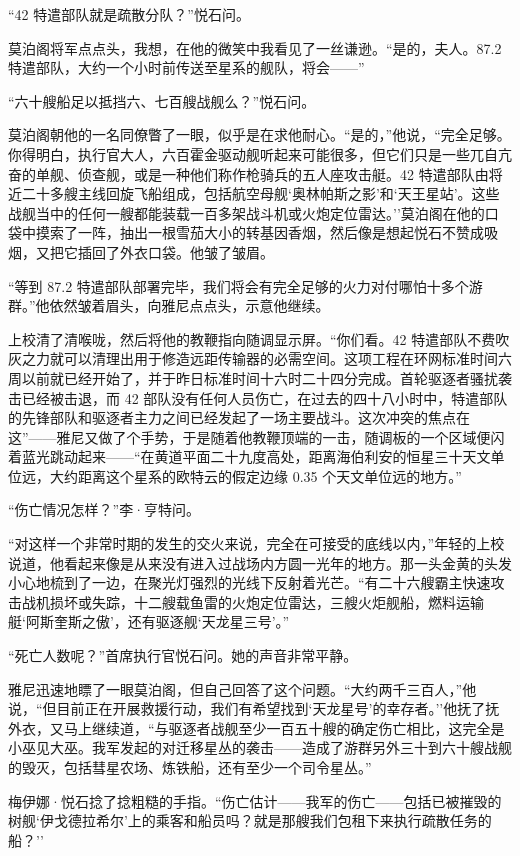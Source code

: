 \documentclass[AutoFakeBold=true]{book}
\begin{document}
``42 特遣部队就是疏散分队？''悦石问。

莫泊阁将军点点头，我想，在他的微笑中我看见了一丝谦逊。``是的，夫人。87.2 特遣部队，大约一个小时前传送至星系的舰队，将会——''

``六十艘船足以抵挡六、七百艘战舰么？''悦石问。

莫泊阁朝他的一名同僚瞥了一眼，似乎是在求他耐心。``是的，''他说，``完全足够。你得明白，执行官大人，六百霍金驱动舰听起来可能很多，但它们只是一些兀自亢奋的单舰、侦查舰，或是一种他们称作枪骑兵的五人座攻击艇。42 特遣部队由将近{\kaishu 二十多}艘主线回旋飞船组成，包括航空母舰`奥林帕斯之影'和`天王星站'。这些战舰当中的任何一艘都能装载一百多架战斗机或火炮定位雷达。''莫泊阁在他的口袋中摸索了一阵，抽出一根雪茄大小的转基因香烟，然后像是想起悦石不赞成吸烟，又把它插回了外衣口袋。他皱了皱眉。

``等到 87.2 特遣部队部署完毕，我们将会有完全足够的火力对付哪怕十多个游群。''他依然皱着眉头，向雅尼点点头，示意他继续。

上校清了清喉咙，然后将他的教鞭指向随调显示屏。``你们看。42 特遣部队不费吹灰之力就可以清理出用于修造远距传输器的必需空间。这项工程在环网标准时间六周以前就已经开始了，并于昨日标准时间十六时二十四分完成。首轮驱逐者骚扰袭击已经被击退，而 42 部队没有任何人员伤亡，在过去的四十八小时中，特遣部队的先锋部队和驱逐者主力之间已经发起了一场主要战斗。这次冲突的焦点在这''——雅尼又做了个手势，于是随着他教鞭顶端的一击，随调板的一个区域便闪着蓝光跳动起来——``在黄道平面二十九度高处，距离海伯利安的恒星三十天文单位远，大约距离这个星系的欧特云的假定边缘 0.35 个天文单位远的地方。''

``伤亡情况怎样？''李·亨特问。

``对这样一个非常时期的发生的交火来说，完全在可接受的底线以内，''年轻的上校说道，他看起来像是从来没有进入过战场内方圆一光年的地方。那一头金黄的头发小心地梳到了一边，在聚光灯强烈的光线下反射着光芒。``有二十六艘霸主快速攻击战机损坏或失踪，十二艘载鱼雷的火炮定位雷达，三艘火炬舰船，燃料运输艇`阿斯奎斯之傲'，还有驱逐舰`天龙星三号'。''

``死亡人数呢？''首席执行官悦石问。她的声音非常平静。

雅尼迅速地瞟了一眼莫泊阁，但自己回答了这个问题。``大约两千三百人，''他说，``但目前正在开展救援行动，我们有希望找到`天龙星号'的幸存者。''他抚了抚外衣，又马上继续道，``与驱逐者战舰至少一百五十艘的确定伤亡相比，这完全是小巫见大巫。我军发起的对迁移星丛的袭击——造成了游群另外三十到六十艘战舰的毁灭，包括彗星农场、炼铁船，还有至少一个司令星丛。''

梅伊娜·悦石捻了捻粗糙的手指。``伤亡估计——{\kaishu 我军的}伤亡——包括已被摧毁的树舰`伊戈德拉希尔'上的乘客和船员吗？就是那艘我们包租下来执行疏散任务的船？''
\end{document}
